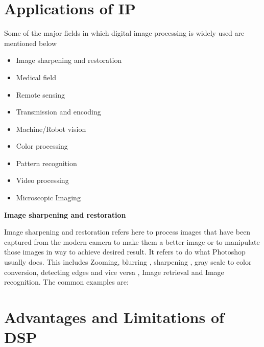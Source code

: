 \documentclass{article}
\begin{document}
\begin{multicols}{2}
    \section{Applications of IP\cite{appIP}}
        Some of the major fields in which digital image processing is widely 
        used are mentioned below
        \begin{itemize}
            \item Image sharpening and restoration
            \item Medical field
            \item Remote sensing
            \item Transmission and encoding
            \item Machine/Robot vision
            \item Color processing
            \item Pattern recognition
            \item Video processing
            \item Microscopic Imaging
        \end{itemize}
        \textbf{Image sharpening and restoration}
        \par
        Image sharpening and restoration refers here to process images that 
        have been captured from the modern camera to make them a better image 
        or to manipulate those images in way to achieve desired result. It 
        refers to do what Photoshop usually does. This includes Zooming, 
        blurring , sharpening , gray scale to color conversion, detecting 
        edges and vice versa , Image retrieval and Image recognition. The 
        common examples are: 
    \section{Advantages and Limitations of DSP\cite{advDisadvDsp}}

\end{multicols}
\end{document}

